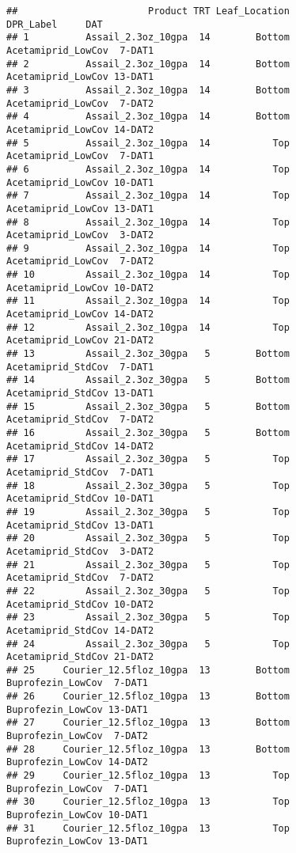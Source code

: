 \documentclass[
]{article}
\begin{document}
\begin{verbatim}
##                       Product TRT Leaf_Location              DPR_Label     DAT
## 1          Assail_2.3oz_10gpa  14        Bottom     Acetamiprid_LowCov  7-DAT1
## 2          Assail_2.3oz_10gpa  14        Bottom     Acetamiprid_LowCov 13-DAT1
## 3          Assail_2.3oz_10gpa  14        Bottom     Acetamiprid_LowCov  7-DAT2
## 4          Assail_2.3oz_10gpa  14        Bottom     Acetamiprid_LowCov 14-DAT2
## 5          Assail_2.3oz_10gpa  14           Top     Acetamiprid_LowCov  7-DAT1
## 6          Assail_2.3oz_10gpa  14           Top     Acetamiprid_LowCov 10-DAT1
## 7          Assail_2.3oz_10gpa  14           Top     Acetamiprid_LowCov 13-DAT1
## 8          Assail_2.3oz_10gpa  14           Top     Acetamiprid_LowCov  3-DAT2
## 9          Assail_2.3oz_10gpa  14           Top     Acetamiprid_LowCov  7-DAT2
## 10         Assail_2.3oz_10gpa  14           Top     Acetamiprid_LowCov 10-DAT2
## 11         Assail_2.3oz_10gpa  14           Top     Acetamiprid_LowCov 14-DAT2
## 12         Assail_2.3oz_10gpa  14           Top     Acetamiprid_LowCov 21-DAT2
## 13         Assail_2.3oz_30gpa   5        Bottom     Acetamiprid_StdCov  7-DAT1
## 14         Assail_2.3oz_30gpa   5        Bottom     Acetamiprid_StdCov 13-DAT1
## 15         Assail_2.3oz_30gpa   5        Bottom     Acetamiprid_StdCov  7-DAT2
## 16         Assail_2.3oz_30gpa   5        Bottom     Acetamiprid_StdCov 14-DAT2
## 17         Assail_2.3oz_30gpa   5           Top     Acetamiprid_StdCov  7-DAT1
## 18         Assail_2.3oz_30gpa   5           Top     Acetamiprid_StdCov 10-DAT1
## 19         Assail_2.3oz_30gpa   5           Top     Acetamiprid_StdCov 13-DAT1
## 20         Assail_2.3oz_30gpa   5           Top     Acetamiprid_StdCov  3-DAT2
## 21         Assail_2.3oz_30gpa   5           Top     Acetamiprid_StdCov  7-DAT2
## 22         Assail_2.3oz_30gpa   5           Top     Acetamiprid_StdCov 10-DAT2
## 23         Assail_2.3oz_30gpa   5           Top     Acetamiprid_StdCov 14-DAT2
## 24         Assail_2.3oz_30gpa   5           Top     Acetamiprid_StdCov 21-DAT2
## 25     Courier_12.5floz_10gpa  13        Bottom      Buprofezin_LowCov  7-DAT1
## 26     Courier_12.5floz_10gpa  13        Bottom      Buprofezin_LowCov 13-DAT1
## 27     Courier_12.5floz_10gpa  13        Bottom      Buprofezin_LowCov  7-DAT2
## 28     Courier_12.5floz_10gpa  13        Bottom      Buprofezin_LowCov 14-DAT2
## 29     Courier_12.5floz_10gpa  13           Top      Buprofezin_LowCov  7-DAT1
## 30     Courier_12.5floz_10gpa  13           Top      Buprofezin_LowCov 10-DAT1
## 31     Courier_12.5floz_10gpa  13           Top      Buprofezin_LowCov 13-DAT1

\end{verbatim}
\end{document}
